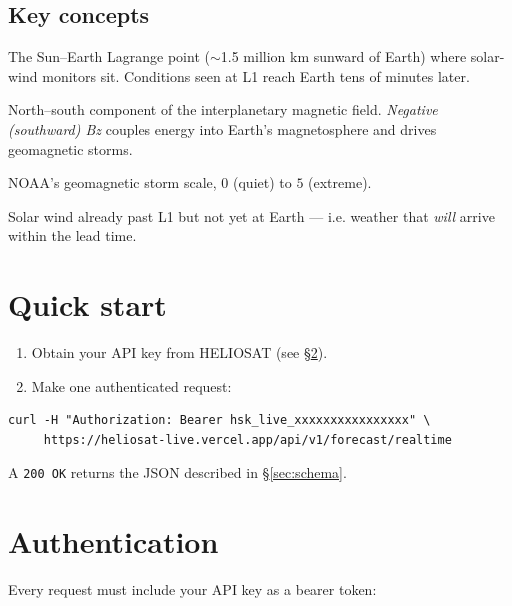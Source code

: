 \documentclass[11pt,a4paper]{article}
\newcommand{\tc}[1]{\texttt{#1}}
\begin{document}
\subsection{Key concepts}
\begin{description}[leftmargin=0pt,style=nextline]
  \item[L1] The Sun--Earth Lagrange point (\(\sim\)1.5 million km sunward of Earth)
        where solar-wind monitors sit. Conditions seen at L1 reach Earth tens of
        minutes later.
  \item[Bz (nT)] North--south component of the interplanetary magnetic field.
        \emph{Negative (southward) Bz} couples energy into Earth's magnetosphere and
        drives geomagnetic storms.
  \item[G-scale] NOAA's geomagnetic storm scale, \(0\) (quiet) to \(5\) (extreme).
  \item[Inbound parcel] Solar wind already past L1 but not yet at Earth --- i.e. weather
        that \emph{will} arrive within the lead time.
\end{description}

\section{Quick start}

\begin{enumerate}[leftmargin=1.4em]
  \item Obtain your API key from HELIOSAT (see \S\ref{sec:auth}).
  \item Make one authenticated request:
\end{enumerate}

\begin{lstlisting}[style=bash]
curl -H "Authorization: Bearer hsk_live_xxxxxxxxxxxxxxxx" \
     https://heliosat-live.vercel.app/api/v1/forecast/realtime
\end{lstlisting}

A \tc{200 OK} returns the JSON described in \S\ref{sec:schema}.

\section{Authentication}\label{sec:auth}

Every request must include your API key as a bearer token:
\end{document}
